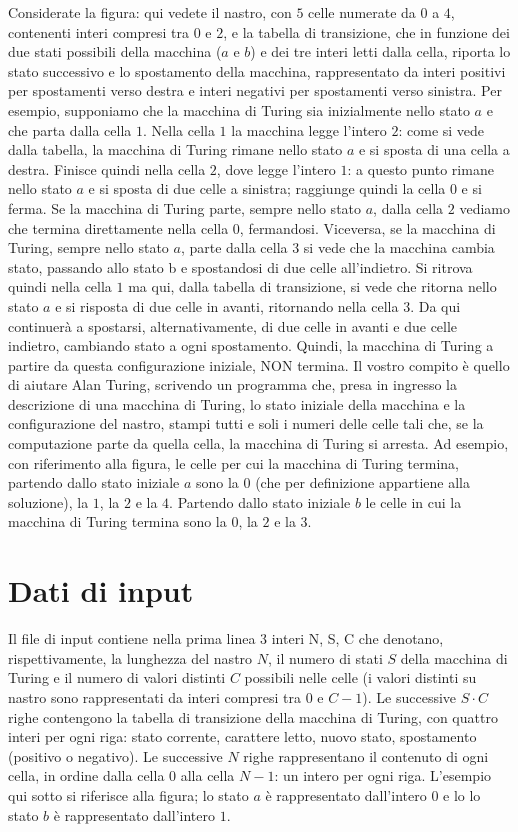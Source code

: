 \documentclass[a4paper,11pt]{article}
\begin{document}
Considerate la figura: qui vedete il nastro, con $5$ celle numerate da
$0$ a $4$, contenenti interi compresi tra $0$ e $2$, e la tabella di
transizione, che in funzione dei due stati possibili della macchina ($a$
e $b$) e dei tre interi letti dalla cella, riporta lo stato successivo e
lo spostamento della macchina, rappresentato da interi positivi per
spostamenti verso destra e interi negativi per spostamenti verso
sinistra. Per esempio, supponiamo che la macchina di Turing sia
inizialmente nello stato $a$ e che parta dalla cella $1$. Nella cella
$1$ la macchina legge l'intero $2$: come si vede dalla tabella, la
macchina  di Turing rimane nello stato $a$ e si sposta di una cella a
destra. Finisce quindi nella cella $2$, dove legge l'intero $1$: a
questo punto rimane nello stato $a$ e si sposta di due celle a sinistra;
raggiunge quindi la cella $0$ e si ferma.  Se la macchina di Turing
parte, sempre nello stato $a$, dalla cella $2$ vediamo che termina
direttamente nella cella $0$, fermandosi. Viceversa, se la macchina di
Turing, sempre nello stato $a$, parte dalla cella $3$ si vede che la
macchina cambia stato, passando allo stato b e spostandosi di due celle
all'indietro. Si ritrova quindi nella cella $1$ ma qui, dalla tabella di
transizione, si vede che ritorna nello stato $a$ e si risposta di due
celle in avanti, ritornando nella cella $3$. Da qui continuerà a
spostarsi, alternativamente, di due celle in avanti e due celle
indietro, cambiando stato a ogni spostamento. Quindi, la macchina di
Turing a partire da questa configurazione iniziale, NON termina.  Il
vostro compito è quello di aiutare Alan Turing, scrivendo un programma
che, presa in ingresso la descrizione di una macchina di Turing, lo
stato iniziale della macchina e la configurazione del nastro, stampi
tutti e soli i numeri delle celle tali che, se la computazione parte da
quella cella, la macchina di Turing si arresta. Ad esempio, con
riferimento alla figura, le celle per cui la macchina di Turing termina,
partendo dallo stato iniziale $a$ sono la $0$ (che per definizione
appartiene alla soluzione), la $1$, la $2$ e la $4$.  Partendo dallo
stato iniziale $b$ le celle in cui la macchina di Turing termina sono la
$0$, la $2$ e la $3$. 


\section*{Dati di input}
  
Il file di input contiene nella prima linea 3 interi N, S, C che
denotano, rispettivamente, la lunghezza del nastro $N$, il numero di
stati $S$ della macchina di Turing e il numero di valori distinti $C$
possibili nelle celle (i valori distinti su nastro sono rappresentati da
interi compresi tra $0$ e $C-1$).  Le successive $S\cdot C$ righe
contengono la tabella di transizione della macchina di Turing, con
quattro interi per ogni riga: stato corrente, carattere letto, nuovo
stato, spostamento (positivo o negativo).  Le successive $N$ righe
rappresentano il contenuto di ogni cella, in ordine dalla cella $0$ alla
cella $N-1$: un intero per ogni riga. L'esempio qui sotto si riferisce
alla figura; lo stato $a$ è rappresentato dall'intero $0$ e lo lo stato
$b$ è rappresentato dall'intero $1$.
\end{document}
